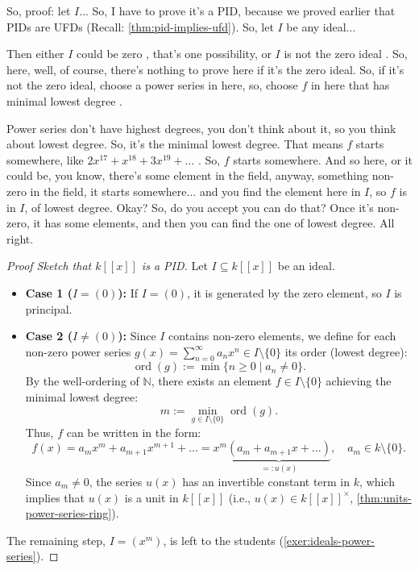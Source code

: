 \begin{speech}[00:03:57 - 00:05:31]
So, proof: let $I$...  So, I have to prove it's a PID, because we proved earlier that PIDs are UFDs (Recall: \cref{thm:pid-implies-ufd}). So, let $I$ be any ideal...

Then either $I$ could be zero , that's one possibility, or $I$ is not the zero ideal . So, here, well, of course, there's nothing to prove here if it's the zero ideal. So, if it's not the zero ideal, choose a power series in here, so, choose $f$ in here that has minimal lowest degree .

Power series don't have highest degrees, you don't think about it, so you think about lowest degree. So, it's the minimal lowest degree. That means $f$ starts somewhere, like $2x^{17} + x^{18} + 3x^{19} + \dots$ . So, $f$ starts somewhere. And so here, or it could be, you know, there's some element in the field, anyway, something non-zero in the field, it starts somewhere... and you find the element here in $I$, so $f$ is in $I$, of lowest degree. Okay? So, do you accept you can do that? Once it's non-zero, it has some elements, and then you can find the one of lowest degree. All right.
\end{speech}

\begin{content}
\begin{proof}[{Proof Sketch that $k[[x]]$ is a PID}]\label{proof:power-series-pid}
Let $I \subseteq k[[x]]$ be an ideal.
\begin{itemize}
    \item \textbf{Case 1 ($I = (0)$):} If $I = (0)$, it is generated by the zero element, so $I$ is principal.
    \item \textbf{Case 2 ($I \neq (0)$):} Since $I$ contains non-zero elements, we define for each non-zero power series $g(x) = \sum_{n=0}^\infty a_n x^n \in I \setminus \{0\}$ its order (lowest degree):
    \[
    \operatorname{ord}(g) := \min \{ n \ge 0 \mid a_n \neq 0 \}.
    \]
    By the well-ordering of $\mathbb{N}$, there exists an element $f \in I \setminus \{0\}$ achieving the minimal lowest degree:
    \[
    m := \min_{g \in I \setminus \{0\}} \operatorname{ord}(g).
    \]
    Thus, $f$ can be written in the form:
    \[
    f(x) = a_m x^m + a_{m+1} x^{m+1} + \dots = x^m \underbrace{(a_m + a_{m+1} x + \dots)}_{=: u(x)}, \quad a_m \in k \setminus \{0\}.
    \]
    Since $a_m \neq 0$, the series $u(x)$ has an invertible constant term in $k$, which implies that $u(x)$ is a unit in $k[[x]]$ (i.e., $u(x) \in k[[x]]^\times$, \cref{thm:units-power-series-ring}).
\end{itemize}
The remaining step, $I = (x^m)$, is left to the students (\cref{exer:ideals-power-series}).
\end{proof}
\end{content}

